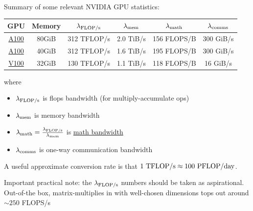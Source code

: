 \documentclass[11pt]{article}
\begin{document}
Summary of some relevant NVIDIA GPU statistics:
\begin{center}
	\begin{tabular}{| c |c| c |c |c| c| }\hline
		GPU                                                                                                                                  & Memory & $ \lambda _{ {\rm FLOP/s }  } $ & $ \lambda _{ {\rm mem}  } $ & $ \lambda _{ {\rm math}  } $ & $ \lambda _{ {\rm comms}  } $ \\ \hline
		\href{https://www.nvidia.com/content/dam/en-zz/Solutions/Data-Center/a100/pdf/nvidia-a100-datasheet-nvidia-us-2188504-web.pdf}{A100} & 80GiB  & 312  TFLOP/s                    & 2.0 TiB/s                   & 156 FLOPS/B                  & 300 GiB/s                     \\ \hline
		\href{https://www.nvidia.com/content/dam/en-zz/Solutions/Data-Center/a100/pdf/nvidia-a100-datasheet.pdf}{A100}                       & 40GiB  & 312  TFLOP/s                    & 1.6 TiB/s                   & 195 FLOPS/B                  & 300 GiB/s                     \\ \hline
		\href{https://images.nvidia.com/content/technologies/volta/pdf/volta-v100-datasheet-update-us-1165301-r5.pdf}{V100}                  & 32GiB  & 130  TFLOP/s                    & 1.1 TiB/s                   & 118  FLOPS/B                 & 16 GiB/s                      \\ \hline
	\end{tabular}
\end{center}
where
\begin{itemize}
	\item $ \lambda _{ {\rm  FLOP/s}  } $ is flops bandwidth (for   multiply-accumulate ops)
	\item $ \lambda _{ {\rm  mem}  } $ is memory bandwidth
	\item $ \lambda _{ {\rm  math}  } = \frac{  \lambda _{ {\rm FLOP/s}  } }{ \lambda _{ {\rm mem} } } $ is \href{https://docs.nvidia.com/deeplearning/performance/dl-performance-gpu-background/index.html#gpu-arch}{math bandwidth}
	\item $ \lambda _{ {\rm  comms}  } $ is one-way communication bandwidth
\end{itemize}
A useful approximate conversion rate is that $ 1 \ {\rm TFLOP/s} \approx 100\  {\rm PFLOP/day} $.

Important practical note: the $ \lambda _{ {\rm FLOP/s} } $ numbers should be taken as aspirational.
Out-of-the box,  matrix-multiplies in  with well-chosen
dimensions tops out around $ \sim 250 $ FLOPS/s
\end{document}
